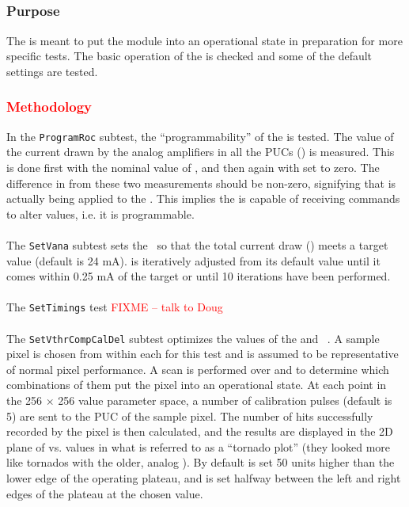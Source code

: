 \subsection{\pretest}
\label{ss:pretest}

\subsubsection{Purpose}

The \pretest is meant to put the module into an operational state in preparation for more specific tests.
The basic operation of the \roc is checked and some of the default \dac settings are tested.

\subsubsection{\textcolor{red}{Methodology}}

In the {\tt ProgramRoc} subtest, the ``programmability'' of the \roc is tested.
The value of the current drawn by the analog amplifiers in all the PUCs (\iana) is measured.
This is done first with the nominal value of \vana, and then again with \vana set to zero.
The difference in \iana from these two measurements should be non-zero,
signifying that \vana is actually being applied to the \roc.
This implies the \roc is capable of receiving commands to alter \dac values, i.e. it is programmable.
\\\\
The {\tt SetVana} subtest sets the \vana~\dac so that the total current draw (\iana) meets a target value (default is 24 mA).
\vana is iteratively adjusted from its default value until it comes within 0.25 mA of the target 
or until 10 iterations have been performed.
\\\\
The {\tt SetTimings} test \textcolor{red}{FIXME – talk to Doug}
\\\\
The {\tt SetVthrCompCalDel} subtest optimizes the values of the \vthrcomp and \caldel~\dacs.
A sample pixel is chosen from within each \roc for this test and is assumed to be representative of normal pixel performance.
A scan is performed over \vthrcomp and \caldel to determine which combinations of them put the pixel into an operational state.
At each point in the 256 $\times$ 256 value parameter space,
a number of calibration pulses (default is 5) are sent to the PUC of the sample pixel.
The number of hits successfully recorded by the pixel is then calculated,
and the results are displayed in the 2D plane of \vthrcomp vs. \caldel values
in what is referred to as a ``tornado plot'' (they looked more like tornados with the older, analog \roc).
By default \vthrcomp is set 50 units higher than the lower edge of the operating plateau,
and \caldel is set halfway between the left and right edges of the plateau at the chosen \vthrcomp value.

